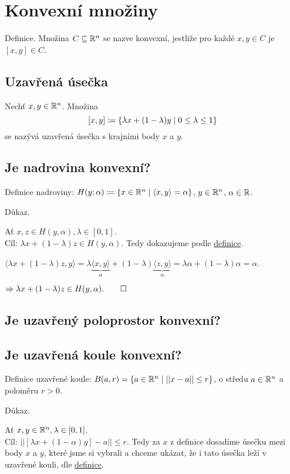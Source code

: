 \section{Konvexní množiny} \label{sec:konvex}
Definice. Množina $C \subseteq \mathbb{R}^n$ se nazve konvexní, jestliže pro každé $x, y \in C$ je $[x,y] \in C$.

\subsection{Uzavřená úsečka}
Nechť $x, y \in \mathbb{R}^n$. Množina
\[ [x,y] \coloneq \left\lbrace \lambda x + (1-\lambda)y \mid 0 \leq \lambda \leq 1 \right\rbrace \]
se nazývá uzavřená úsečka s krajními body $x$ a $y$.

\subsection{Je nadrovina konvexní?}
Definice nadroviny: $H(y; \alpha) \coloneq \left\lbrace x \in \mathbb{R}^n \mid \langle x, y \rangle = \alpha \right\rbrace$, $y \in \mathbb{R}^n$, $\alpha \in \mathbb{R}$.

Důkaz.

Ať $x,z \in H(y, \alpha), \lambda \in [0,1]$.\\
Cíl: $\lambda x + (1-\lambda) z \in H(y, \alpha)$. Tedy dokazujeme podle \hyperref[sec:konvex]{definice}.

$\langle \lambda x + (1-\lambda)z, y \rangle = \lambda \underbrace{\langle x,y \rangle}_{\alpha} + (1-\lambda)
\underbrace{\langle z,y \rangle}_{\alpha} = \lambda \alpha + (1-\lambda) \alpha = \alpha$.

$\Rightarrow \lambda x + (1-\lambda)z \in H(y, \alpha). \qed$

\subsection{Je uzavřený poloprostor konvexní?}

\subsection{Je uzavřená koule konvexní?}
Definice uzavřené koule: $B(a,r) = \left\lbrace a \in \mathbb{R}^n \mid ||x -a || \leq r \right\rbrace$, o středu $a \in \mathbb{R}^n$ a poloměru $r > 0$.

Důkaz.

Ať $x,y \in \mathbb{R}^n, \lambda \in [0,1]$.\\
Cíl: $|| [\lambda x + (1-\alpha)y] - a || \leq r$. Tedy za $x$ z definice dosadíme úsečku mezi body $x$ a $y$, které jsme
si vybrali a chceme ukázat, že i tato úsečka leží v uzavřené kouli, dle \hyperref[sec:konvex]{definice}.


